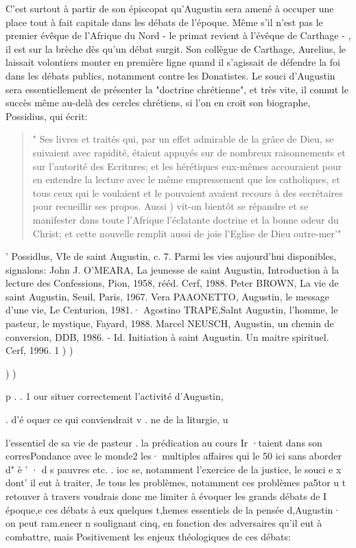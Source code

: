 C'est surtout à partir de son épiscopat qu'Augustin sera amené à occuper une place tout à fait capitale dans les débats de l'époque. Même s'il n'est pas le premier évêque de l'Afrique du Nord - le primat revient à l'évêque de Carthage - , il est sur la brèche dès qu'un débat surgit. Son collègue de Carthage, Aurelius, le laissait volontiers monter en première ligne quand il s'agissait de défendre la foi dans les débats publics, notamment contre les Donatistes. Le souci d'Augustin sera essentiellement de présenter la "doctrine chrétienne", et très vite, il connut le succès même au-delà des cercles chrétiens, si l'on en croit son biographe, Possidius, qui écrit:
\begin{quote}
    " Ses livres et traités qui, par un effet admirable de la grâce de Dieu, se suivaient avec rapidité, étaient appuyés sur de nombreux raisonnements et sur l'autorité des Ecritures; et les hérétiques eux-mêmes accouraient pour en entendre la
lecture avec le même empressement que les catholiques, et tous ceux qui le voulaient
et le pouvaient avaient recours à des secrétaires pour recueillir ses propos. Aussi	)
vit-on bientôt se répandre et se manifester dans toute l'Afrique l'éclatante doctrine et la bonne odeur du Christ; et cette nouvelle remplit aussi de joie l'Eglise de Dieu outre-mer'"
\end{quote}








' Possidlus, VIe de saint Augustin, c. 7. Parmi les vies aujourd'hui disponibles, signalons: John J. O'MEARA, La jeunesse de saint Augustin, Introduction à la lecture des Confessions, Pion, 1958, rééd. Cerf, 1988.   Peter BROWN, La vie de saint Augustin, Seuil, Paris, 1967.   Vera PAAONETTO, Augustin, le message d'une vie, Le Centurion, 1981.· Agostino TRAPE,Salnt Augustin, l'homme, le pasteur, le mystique, Fayard, 1988.   Marcel NEUSCH, Augustin, un chemin de conversion, DDB, 1986. - Id.
Initiation à saint Augustin. Un maitre spirituel. Cerf, 1996.
1
)	)
 
)	)
 
p	.	.	1
our situer correctement l'activité d'Augustin,
 
. d'é oquer ce qui conviendrait	v	.	ne
de  la  liturgie, u
 
l'essentiel de sa vie de pasteur . la prédication au cours Ir ·taient dans son corresPondance avec le monde2  les· multiples affaires qui le 50 ici  sans aborder d" è	'	· d s pauvres etc.	.
ioc se, notamment l'exercice de la justice, le souci e  x  dont' il eut à traiter, Je
tous les problèmes, notamment ces problèmes pa5tor u	t retouver à travers voudrais donc me limiter à évoquer les grands débats de I époque,e		ces débats à eux quelques t,hemes essentiels de la pensée d,Augustin· on peut ram.eneer n soulignant cinq, en  fonction  des adversaires  qu'il  eut  à  combattre,  mais
Positivement les enjeux théologiques de ces débats:

